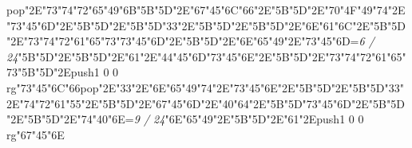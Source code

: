 pop{}\ipa\char"2E\ipa\char"73\ipa\char"74\ipa\char"72\ipa\char"65\ipa\char"49\ipa\char"6B\bigskip\ipa\char"5B\quad\quad\ipa\char"5D\ipa\char"2E\ipa\char"67\ipa\char"45\ipa\char"6C\ipa\char"66\ipa\char"2E\ipa\char"5B\quad\ipa\char"5D\ipa\char"2E\ipa\char"70\ipa\char"4F\ipa\char"49\ipa\char"74\ipa\char"2E\ipa\char"73\ipa\char"45\ipa\char"6D\ipa\char"2E\ipa\char"5B\quad\quad\quad\quad\ipa\char"5D\ipa\char"2E\ipa\char"5B\quad\quad\quad\ipa\char"5D\bigskip\ipa\char"33\ipa\char"2E\ipa\char"5B\quad\quad\quad\quad\ipa\char"5D\ipa\char"2E\ipa\char"5B\quad\quad\ipa\char"5D\ipa\char"2E\ipa\char"6E\ipa\char"61\ipa\char"6C\ipa\char"2E\ipa\char"5B\quad\quad\ipa\char"5D\ipa\char"2E\ipa\char"73\ipa\char"74\ipa\char"72\ipa\char"61\ipa\char"65\ipa\char"73\bigskip\ipa\char"73\ipa\char"45\ipa\char"6D\ipa\char"2E\ipa\char"5B\quad\quad\ipa\char"5D\ipa\char"2E\ipa\char"6E\ipa\char"65\ipa\char"49\ipa\char"2E\ipa\char"73\ipa\char"45\ipa\char"6D\bigskip\vfill\footline={\hfill\tenrm\it 6 / 24}\eject\null\vfill\ipa\char"5B\quad\quad\quad\ipa\char"5D\ipa\char"2E\ipa\char"5B\quad\quad\quad\quad\ipa\char"5D\ipa\char"2E\ipa\char"61\ipa\char"2E\ipa\char"44\ipa\char"45\ipa\char"6D\bigskip\ipa\char"73\ipa\char"45\ipa\char"6E\ipa\char"2E\ipa\char"5B\quad\quad\quad\ipa\char"5D\ipa\char"2E\ipa\char"73\ipa\char"74\ipa\char"72\ipa\char"61\ipa\char"65\ipa\char"73\bigskip\ipa\char"5B\quad\quad\ipa\char"5D\ipa\char"2E\pdfcolorstack\match push{1 0 0 rg}\ipa\char"73\ipa\char"45\ipa\char"6C\ipa\char"66\pdfcolorstack\match pop{}\ipa\char"2E\ipa\char"33\ipa\char"2E\ipa\char"6E\ipa\char"65\ipa\char"49\ipa\char"74\ipa\char"2E\ipa\char"73\ipa\char"45\ipa\char"6E\ipa\char"2E\ipa\char"5B\quad\quad\quad\quad\ipa\char"5D\ipa\char"2E\ipa\char"5B\quad\quad\quad\ipa\char"5D\bigskip\ipa\char"33\ipa\char"2E\ipa\char"74\ipa\char"72\ipa\char"61\ipa\char"55\ipa\char"2E\ipa\char"5B\quad\quad\ipa\char"5D\ipa\char"2E\ipa\char"67\ipa\char"45\ipa\char"6D\ipa\char"2E\ipa\char"40\ipa\char"64\ipa\char"2E\ipa\char"5B\quad\quad\quad\quad\quad\quad\ipa\char"5D\bigskip\ipa\char"73\ipa\char"45\ipa\char"6D\ipa\char"2E\ipa\char"5B\quad\quad\ipa\char"5D\ipa\char"2E\ipa\char"5B\quad\quad\quad\ipa\char"5D\ipa\char"2E\ipa\char"74\ipa\char"40\ipa\char"6E\bigskip\vfill\footline={\hfill\tenrm\it 9 / 24}\eject\null\vfill\ipa\char"6E\ipa\char"65\ipa\char"49\ipa\char"2E\ipa\char"5B\quad\quad\quad\quad\ipa\char"5D\ipa\char"2E\ipa\char"61\ipa\char"2E\pdfcolorstack\match push{1 0 0 rg}\ipa\char"67\ipa\char"45\ipa\char"6E\pdfcolorstack\match 